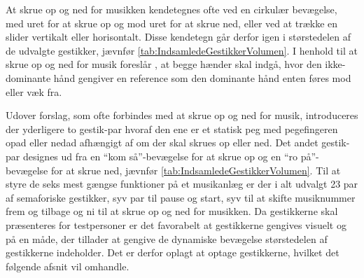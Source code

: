 \noindent
%
At skrue op og ned for musikken kendetegnes ofte ved en cirkulær bevægelse, med uret for at skrue op og mod uret for at skrue ned, eller ved at trække en slider vertikalt eller horisontalt. Disse kendetegn går derfor igen i størstedelen af de udvalgte gestikker, jævnfør \autoref{tab:IndsamledeGestikkerVolumen}. I henhold til at skrue op og ned for musik foreslår \textcite[s. 48]{PDF:UserDefinedGesturesTV}, at begge hænder skal indgå, hvor den ikke-dominante hånd gengiver en reference som den dominante hånd enten føres mod eller væk fra.

Udover forslag, som ofte forbindes med at skrue op og ned for musik, introduceres der yderligere to gestik-par hvoraf den ene er et statisk peg med pegefingeren opad eller nedad afhængigt af om der skal skrues op eller ned. Det andet gestik-par designes ud fra en \enquote{kom så}-bevægelse for at skrue op og en \enquote{ro på}-bevægelse for at skrue ned, jævnfør \autoref{tab:IndsamledeGestikkerVolumen}. \blankline
%
Til at styre de seks mest gængse funktioner på et musikanlæg er der i alt udvalgt 23 par af semaforiske gestikker, syv par til pause og start, syv til at skifte musiknummer frem og tilbage og ni til at skrue op og ned for musikken. Da gestikkerne skal præsenteres for testpersoner er det favorabelt at gestikkerne gengives visuelt og på en måde, der tillader at gengive de dynamiske bevægelse størstedelen af gestikkerne indeholder. Det er derfor oplagt at optage gestikkerne, hvilket det følgende afsnit vil omhandle. 
%
